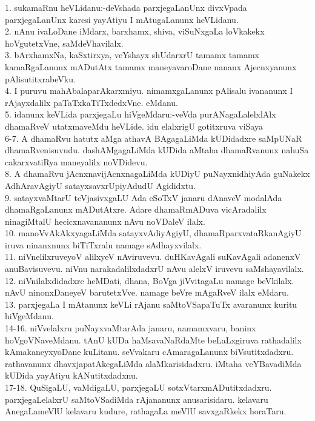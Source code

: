 \documentclass{article}
\begin{document}
1. sukamaRnu heVLidanu:-deVshada parxjegaLanUnx divxVpada parxjegaLanUnx karesi yayAtiyu I mAtugaLanunx heVLidanu.\\
2. nAnu ivaLoDane iMdarx, barxhamx, shiva, viSuNxgaLa loVkakekx hoVgutetxVne, saMdeVhavilalx.\\
3. bArxhamxNa, kaSxtirxya, veYshayx shUdarxrU tamamx tamamx kamaRgaLanunx mADutAtx tamamx maneyavaroDane nananx Ajecnxyanunx pAlisutitxrabeVku.\\
4. I puruvu mahAbalaparAkarxmiyu. nimamxgaLanunx pAlisalu ivananunx I rAjayxdalilx paTaTxkaTiTxdedxVne. eMdanu.\\
5. idanunx keVLida parxjegaLu hiVgeMdaru:-veVda purANagaLalelxlAlx dhamaRveV utatxmaveMdu heVLide. idu elalxrigU gotitxruva viSaya\\
6-7. A dhamaRvu hatutx aMga athavA BAgagaLiMda kUDidadxre saMpUNaR dhamaRvenisuvudu. dashAMgagaLiMda kUDida aMtaha dhamaRvanunx nahuSa cakarxvatiRya maneyalilx noVDidevu.\\
8. A dhamaRvu jAcnxnavijAcnxnagaLiMda kUDiyU puNayxnidhiyAda guNakekx AdhAravAgiyU satayxsavxrUpiyAdudU Agididxtu.\\
9. satayxvaMtarU teVjasivxgaLU Ada eSoTxV janaru dAnaveV modalAda dhamaRgaLanunx mADutAtxre. Adare dhamaRmADuva vicAradalilx ninagiMtalU hecicxnavananunx nAvu noVDaleV ilalx.\\
10. manoVvAkAkxyagaLiMda satayxvAdiyAgiyU, dhamaRparxvataRkanAgiyU iruva ninanxnunx biTiTxralu namage sAdhayxvilalx.\\
11. niVnelilxruveyoV alilxyeV nAviruvevu. duHKavAgali suKavAgali adanenxV anuBavisuvevu. niVnu narakadalilxdadxrU nAvu alelxV iruvevu saMshayavilalx.\\
12. niVnilalxdidadxre heMDati, dhana, BoVga jiVvitagaLu namage beVkilalx. nAvU ninonxDaneyeV barutetxVve. namage beVre mAgaRveV ilalx eMdaru.\\
13. parxjegaLa I mAtanunx keVLi rAjanu saMtoVSapaTuTx avaranunx kuritu hiVgeMdanu.\\
14-16. niVvelalxru puNayxvaMtarAda janaru, namamxvaru, baninx hoVgoVNaveMdanu. tAnU kUDa haMsavaNaRdaMte beLaLxgiruva rathadalilx kAmakaneyxyoDane kuLitanu. seVvakaru cAmaragaLanunx biVsutitxdadxru. rathavanunx dhavxjapatAkegaLiMda alaMkarisidadxru. iMtaha veYBavadiMda kUDida yayAtiyu kANutitxdadxnu.\\
17-18. QuSigaLU, vaMdigaLU, parxjegaLU sotxVtarxmADutitxdadxru. parxjegaLelalxrU saMtoVSadiMda rAjananunx anusarisidaru. kelavaru AnegaLameVlU kelavaru kudure, rathagaLa meVlU savxgaRkekx horaTaru.\\
\end{document}
